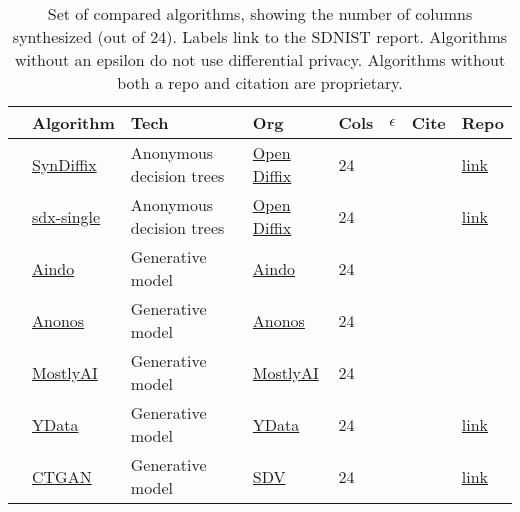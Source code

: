\begin{table}
    \centering
    \caption{Set of compared algorithms, showing the number of columns synthesized (out of 24). Labels link to the SDNIST report. Algorithms without an epsilon do not use differential privacy. Algorithms without both a repo and citation are proprietary.}
    \label{tab:infotable}
    \begin{tabular}{llllllll}
        \toprule
          & Algorithm & Tech & Org & Cols & \thinspace$\epsilon$\qquad\qquad & Cite & Repo \\
        \midrule
        \cellcolor{blue} & \href{https://htmlpreview.github.io/?https://github.com/yoid2000/sdnist-summary/blob/main/results/syndiffix_all/report.html}{SynDiffix} & Anonymous decision trees & \href{https://www.open-diffix.org/}{Open Diffix} & 24 &  & \cite{francis2023syndiffix} & \href{https://github.com/diffix/syndiffix}{link} \\
        \cellcolor{blue} & \href{https://htmlpreview.github.io/?https://github.com/yoid2000/sdnist-summary/blob/main/results/sdx_single/report.html}{sdx-single} & Anonymous decision trees & \href{https://www.open-diffix.org/}{Open Diffix} & 24 &  & \cite{francis2023syndiffix} & \href{https://github.com/diffix/syndiffix}{link} \\
        \cellcolor{red} & \href{https://htmlpreview.github.io/?https://github.com/yoid2000/sdnist-summary/blob/main/results/aindo_synth/report.html}{Aindo} & Generative model & \href{https://www.aindo.com/}{Aindo} & 24 &  &  &  \\
        \cellcolor{red} & \href{https://htmlpreview.github.io/?https://github.com/yoid2000/sdnist-summary/blob/main/results/anonos_sdk/report.html}{Anonos} & Generative model & \href{https://www.anonos.com/}{Anonos} & 24 &  &  &  \\
        \cellcolor{red} & \href{https://htmlpreview.github.io/?https://github.com/yoid2000/sdnist-summary/blob/main/results/mostlyai_sd_platform/report.html}{MostlyAI} & Generative model & \href{https://mostly.ai/}{MostlyAI} & 24 &  &  &  \\
        \cellcolor{red} & \href{https://htmlpreview.github.io/?https://github.com/yoid2000/sdnist-summary/blob/main/results/ydata_fabric_synthesizers/report.html}{YData} & Generative model & \href{https://ydata.ai/}{YData} & 24 &  &  & \href{https://github.com/ydataai/ydata-synthetic}{link} \\
        \cellcolor{red} & \href{https://htmlpreview.github.io/?https://github.com/yoid2000/sdnist-summary/blob/main/results/sdv_ctgan_epochs1000/report.html}{CTGAN} & Generative model & \href{https://sdv.dev/}{SDV} & 24 &  & \cite{xu2019modeling} & \href{https://github.com/sdv-dev/SDV}{link} \\

\end{tabular}
\end{table}
